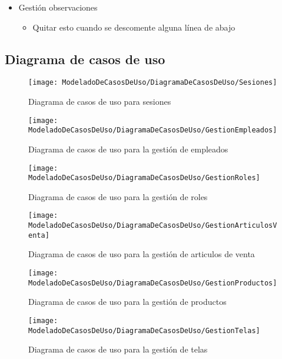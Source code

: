 \begin{itemize}
\begin{itemize}
		\end{itemize}
		\item Gestión observaciones
		\begin{itemize}
			\item Quitar esto cuando se descomente alguna línea de abajo
		\end{itemize}
	\end{itemize}	
	\subsection{Diagrama de casos de uso}
	\begin{figure}[H]
		\centering
		\texttt{[image: ModeladoDeCasosDeUso/DiagramaDeCasosDeUso/Sesiones]}
		\caption{Diagrama de casos de uso para sesiones}
	\label{fig:Sesiones}
	\end{figure}
	\begin{figure}[H]
		\centering
		\texttt{[image: ModeladoDeCasosDeUso/DiagramaDeCasosDeUso/GestionEmpleados]}
		\caption{Diagrama de casos de uso para la gestión de empleados}
	\label{fig:GestionEmpleados}
	\end{figure}
	\begin{figure}[H]
		\centering
		\texttt{[image: ModeladoDeCasosDeUso/DiagramaDeCasosDeUso/GestionRoles]}
		\caption{Diagrama de casos de uso para la gestión de roles}
	\label{fig:GestionRoles}
	\end{figure}
	\begin{figure}[H]
		\centering
		\texttt{[image: ModeladoDeCasosDeUso/DiagramaDeCasosDeUso/GestionArticulosVenta]}
		\caption{Diagrama de casos de uso para la gestión de articulos de venta}
	\label{fig:GestionArticulosVenta}
	\end{figure}
    \begin{figure}[H]
		\centering
		\texttt{[image: ModeladoDeCasosDeUso/DiagramaDeCasosDeUso/GestionProductos]}
		\caption{Diagrama de casos de uso para la gestión de productos}
	\label{fig:GestionProductos}
    \end{figure}
    \begin{figure}[H]
		\centering
		\texttt{[image: ModeladoDeCasosDeUso/DiagramaDeCasosDeUso/GestionTelas]}
		\caption{Diagrama de casos de uso para la gestión de telas}
	\label{fig:GestionTelas}
    \end{figure}
